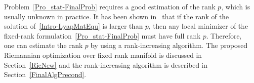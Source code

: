 \documentclass[11pt]{article}
\newcommand{\zwhcomm}[2]{{\sf\color{purple} #1}{\sf\color{blue} #2}}
\numberwithin{equation}{section}
\begin{document}
Problem~\eqref{Pro_stat-FinalProb} requires a good estimation of the rank $p$, which is usually unknown in practice. It has been shown in~\cite{Bart10} that if the rank of the solution of~\eqref{Intro-LyapMatEqu} is larger than $p$, then any local minimizer of the fixed-rank formulation~\eqref{Pro_stat-FinalProb} must have full rank $p$. Therefore, one can estimate the rank $p$ by using a rank-increasing algorithm. The proposed Riemannian optimization over fixed rank manifold is discussed in Section~\ref{RieNew} and the rank-increasing algorithm is described in Section~\ref{FinalAlgPrecond}.

\end{document}
